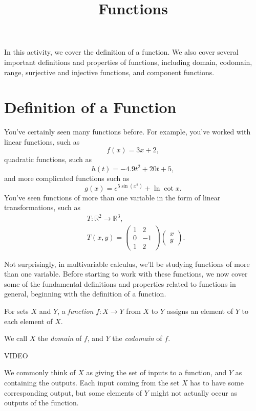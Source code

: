 \documentclass{ximera}
\title{Functions}
\begin{document}
\begin{abstract}
\end{abstract}
\maketitle

In this activity, we cover the definition of a function. We also cover several important definitions and properties of functions, including domain, codomain, range, surjective and injective functions, and component functions.

\section{Definition of a Function}

You've certainly seen many functions before. For example, you've worked with linear functions, such as
\[
f(x) = 3x+2,
\]
quadratic functions, such as
\[
h(t) = -4.9t^2 + 20t + 5,
\]
and more complicated functions such as
\[
g(x) = e^{5\sin(x^2)}+\ln \cot x.
\]
You've seen functions of more than one variable in the form of linear transformations, such as
\begin{align*}
&T:\mathbb{R}^2\rightarrow\mathbb{R}^3,\\
&T(x,y) = \left(\begin{array}{cc}
1 & 2\\
0 & -1\\
1 & 2
\end{array}\right)
\left(\begin{array}{c}
x\\
y
\end{array}\right).
\end{align*}

Not surprisingly, in multivariable calculus, we'll be studying functions of more than one variable. Before starting to work with these functions, we now cover some of the fundamental definitions and properties related to functions in general, beginning with the definition of a function.

\begin{definition}
For sets $X$ and $Y$, a \emph{function} $f:X\rightarrow Y$ from $X$ to $Y$ assigns an element of $Y$ to each element of $X$.

We call $X$ the \emph{domain} of $f$, and $Y$ the \emph{codomain} of $f$.
\end{definition}

VIDEO

We commonly think of $X$ as giving the set of inputs to a function, and $Y$ as containing the outputs. Each input coming from the set $X$ has to have some corresponding output, but some elements of $Y$ might not actually occur as outputs of the function.
\end{document}
